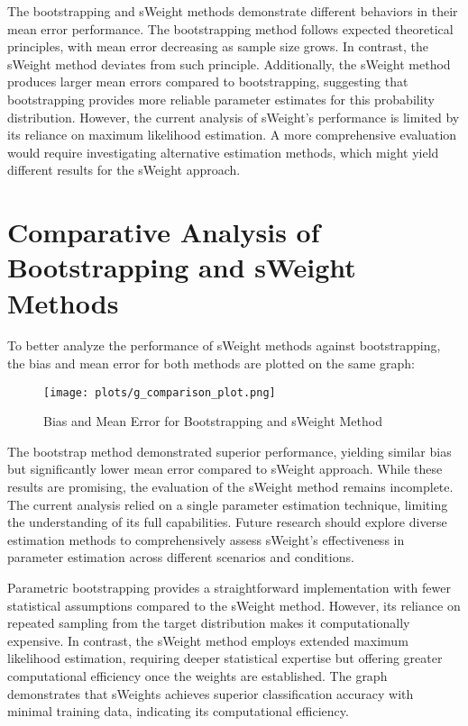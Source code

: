 \documentclass[a4paper, 12pt]{article}
\begin{document}
\par The bootstrapping and sWeight methods demonstrate different behaviors in their mean error performance. The bootstrapping method follows expected theoretical principles, with mean error decreasing as sample size grows. In contrast, the sWeight method deviates from such principle. Additionally, the sWeight method produces larger mean errors compared to bootstrapping, suggesting that bootstrapping provides more reliable parameter estimates for this probability distribution. However, the current analysis of sWeight's performance is limited by its reliance on maximum likelihood estimation. A more comprehensive evaluation would require investigating alternative estimation methods, which might yield different results for the sWeight approach.

\section{Comparative Analysis of Bootstrapping and sWeight Methods}
\hspace{1.5em}To better analyze the performance of sWeight methods against bootstrapping, the bias and mean error for both methods are plotted on the same graph:
\begin{figure}[H]
    \centering
    \texttt{[image: plots/g\_comparison\_plot.png]}
    \caption{Bias and Mean Error for Bootstrapping and sWeight Method}
    \label{fig:enter-label}
\end{figure}
\par The bootstrap method demonstrated superior performance, yielding similar bias but significantly lower mean error compared to sWeight approach. While these results are promising, the evaluation of the sWeight method remains incomplete. The current analysis relied on a single parameter estimation technique, limiting the understanding of its full capabilities. Future research should explore diverse estimation methods to comprehensively assess sWeight's effectiveness in parameter estimation across different scenarios and conditions.
\par Parametric bootstrapping provides a straightforward implementation with fewer statistical assumptions compared to the sWeight method. However, its reliance on repeated sampling from the target distribution makes it computationally expensive. In contrast, the sWeight method employs extended maximum likelihood estimation, requiring deeper statistical expertise but offering greater computational efficiency once the weights are established. The graph demonstrates that sWeights achieves superior classification accuracy with minimal training data, indicating its computational efficiency. 
\end{document}
